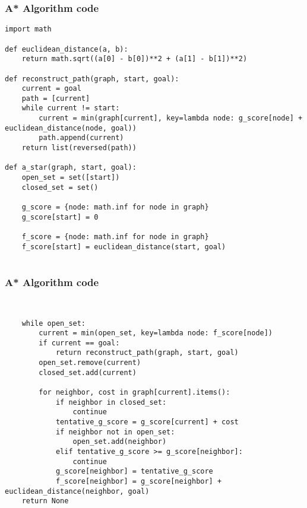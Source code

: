 \begin{frame}[fragile]\frametitle{A* Algorithm code}

\begin{lstlisting}[basicstyle=\tiny]
import math

def euclidean_distance(a, b):
    return math.sqrt((a[0] - b[0])**2 + (a[1] - b[1])**2)

def reconstruct_path(graph, start, goal):
    current = goal
    path = [current]
    while current != start:
        current = min(graph[current], key=lambda node: g_score[node] + euclidean_distance(node, goal))
        path.append(current)
    return list(reversed(path))
	
def a_star(graph, start, goal):
    open_set = set([start])
    closed_set = set()
    
    g_score = {node: math.inf for node in graph}
    g_score[start] = 0
    
    f_score = {node: math.inf for node in graph}
    f_score[start] = euclidean_distance(start, goal)
	
\end{lstlisting}

\end{frame}


\begin{frame}[fragile]\frametitle{A* Algorithm code}

\begin{lstlisting}[basicstyle=\tiny]

    
    while open_set:
        current = min(open_set, key=lambda node: f_score[node])
        if current == goal:
            return reconstruct_path(graph, start, goal)
        open_set.remove(current)
        closed_set.add(current)
        
        for neighbor, cost in graph[current].items():
            if neighbor in closed_set:
                continue
            tentative_g_score = g_score[current] + cost
            if neighbor not in open_set:
                open_set.add(neighbor)
            elif tentative_g_score >= g_score[neighbor]:
                continue
            g_score[neighbor] = tentative_g_score
            f_score[neighbor] = g_score[neighbor] + euclidean_distance(neighbor, goal)
    return None
\end{lstlisting}

\end{frame}


